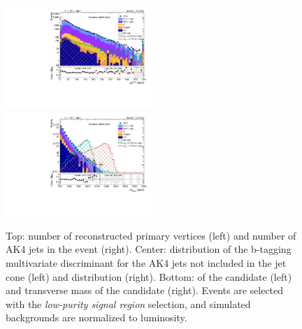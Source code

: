 \begin{figure}[!htb]
\begin{center}
    \includegraphics[width=0.495\textwidth]{plots/v9_thesis/XVZnnlpSR/X_pt.pdf}
    \includegraphics[width=0.495\textwidth]{plots/v9_thesis/XVZnnlpSR/X_tmass.pdf}

    \caption{Top: number of reconstructed primary vertices (left) and number of AK4 jets in the event (right). Center: distribution of the b-tagging multivariate discriminant for the AK4 jets not included in the \V jet cone (left) and \MET distribution (right). Bottom: \pt of the \VZ candidate (left) and transverse mass of the \VZ candidate (right). Events are selected with the \emph{low-purity signal region} selection, and simulated backgrounds are normalized to luminosity.}
  \end{center}
\end{figure}

\clearpage



